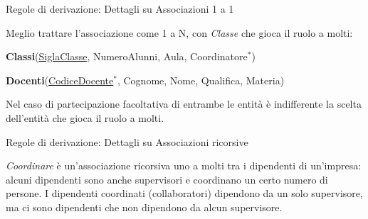 \begin{frame}{Regole di derivazione: Dettagli su Associazioni 1 a 1}
\pause

Meglio trattare l'associazione come 1 a N, con \textit{Classe} che gioca il ruolo a molti:

\pause

\textbf{Classi}(\underline{SiglaClasse}, NumeroAlunni, Aula, Coordinatore$^*$)

\pause

\textbf{Docenti}(\underline{CodiceDocente}$^*$, Cognome, Nome, Qualifica, Materia)

\pause

Nel caso di partecipazione facoltativa di entrambe le entit\`a \`e indifferente  la scelta dell'entit\`a che gioca il ruolo a molti.
\end{frame}
%
\begin{frame}{Regole di derivazione: Dettagli su Associazioni ricorsive}
\vspace{-.5cm}
\begin{minipage}{0.9\textwidth}
\textit{Coordinare} \`e un'associazione ricorsiva uno a molti tra i dipendenti di un'impresa: alcuni dipendenti sono anche supervisori e coordinano un certo numero di persone. I dipendenti coordinati (collaboratori) dipendono da un solo supervisore, ma ci sono dipendenti che non dipendono da alcun supervisore.
\end{minipage}

\begin{center}
\end{center}
\end{frame}
